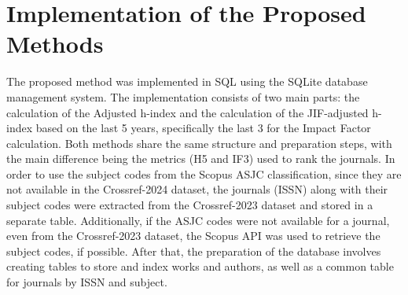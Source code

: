 \section{Implementation of the Proposed Methods}
%
%
%
%

The proposed method was implemented in SQL using the SQLite database management
system. The implementation consists of two main parts: the calculation of the
Adjusted h-index and the calculation of the JIF-adjusted h-index based on the
last 5 years, specifically the last 3 for the Impact Factor calculation. Both
methods share the same structure and preparation steps, with the main
difference being the metrics (H5 and IF3) used to rank the journals. In order
to use the subject codes from the Scopus ASJC classification, since they are
not available in the Crossref-2024 dataset, the journals (ISSN) along with
their subject codes were extracted from the Crossref-2023 dataset and stored in
a separate table. Additionally, if the ASJC codes were not available for a
journal, even from the Crossref-2023 dataset, the Scopus API was used to
retrieve the subject codes, if possible. After that, the preparation of the
database involves creating tables to store and index works and authors, as well
as a common table for journals by ISSN and subject.

